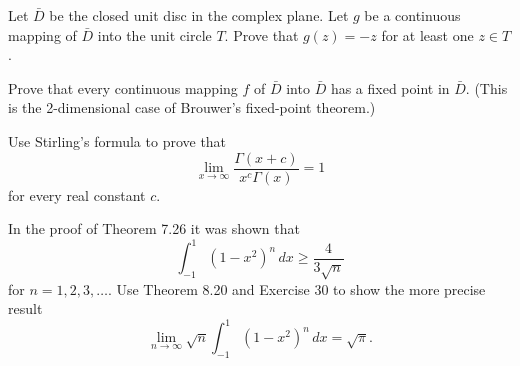   \begin{exercise}[Rudin 8.28]
    Let $\bar{D}$ be the closed unit disc in the complex plane. Let $g$ be a continuous mapping of $\bar{D}$ into the unit circle $T$. Prove that $g(z) = -z$ for at least one $z \in T$.
  \end{exercise}
  \begin{solution}

  \end{solution}

  \begin{exercise}[Rudin 8.29]
    Prove that every continuous mapping $f$ of $\bar{D}$ into $\bar{D}$ has a fixed point in $\bar{D}$. (This is the 2-dimensional case of Brouwer's fixed-point theorem.)
  \end{exercise}
  \begin{solution}

  \end{solution}

  \begin{exercise}[Rudin 8.30]
    Use Stirling's formula to prove that
    \begin{equation}
      \lim_{x \to \infty} \frac{\Gamma (x+c)}{x^c \Gamma (x)} = 1
    \end{equation}
    for every real constant $c$.
  \end{exercise}
  \begin{solution}

  \end{solution}

  \begin{exercise}[Rudin 8.31]
    In the proof of Theorem 7.26 it was shown that
    \begin{equation}
      \int_{-1}^1 (1-x^2)^n \, dx \geq \frac{4}{3\sqrt{n}}
    \end{equation}
    for $n = 1, 2, 3, \dots$. Use Theorem 8.20 and Exercise 30 to show the more precise result
    \begin{equation}
      \lim_{n \to \infty} \sqrt{n} \int_{-1}^1 (1-x^2)^n \, dx = \sqrt{\pi}.
    \end{equation}
  \end{exercise}
  \begin{solution}

  \end{solution}
